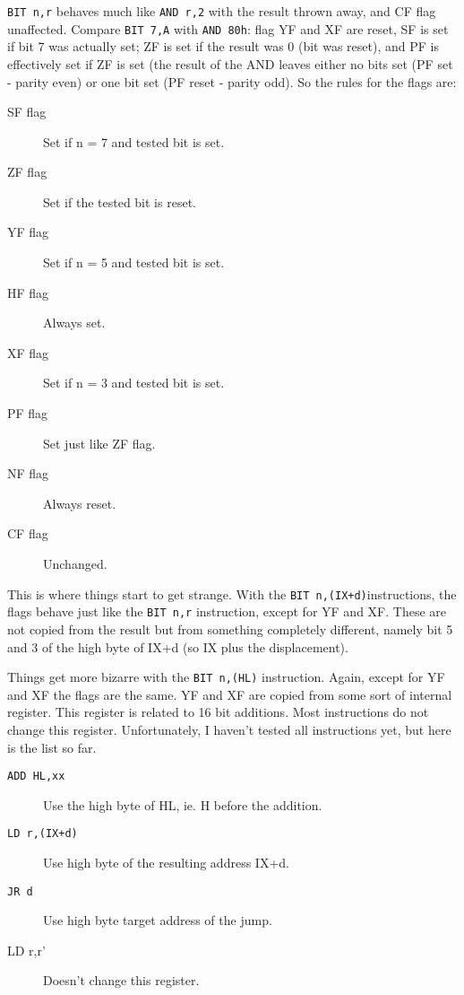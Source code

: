 \documentclass[oneside,a4paper]{book}
\begin{document}
{\tt BIT n,r} behaves much like {\tt AND r,2{\raisebox{1ex}{n}}} with the result thrown away, and CF flag unaffected. Compare {\tt BIT 7,A} with {\tt AND 80h}: flag YF and XF are reset, SF is set if bit 7 was actually set; ZF is set if the result was 0 (bit was reset), and PF is effectively set if ZF is set (the result of the AND leaves either no bits set (PF set - parity even) or one bit set (PF reset - parity odd). So the rules for the flags are:

\begin{description}

	\item[SF flag]
	Set if n = 7 and tested bit is set.

	\item[ZF flag]
	Set if the tested bit is reset.

	\item[YF flag]
	Set if n = 5 and tested bit is set.

	\item[HF flag]
	Always set.

	\item[XF flag]
	Set if n = 3 and tested bit is set.

	\item[PF flag]
	Set just like ZF flag.

	\item[NF flag]
	Always reset. 

	\item[CF flag]
	Unchanged.

\end{description}

This is where things start to get strange. With the {\tt BIT n,(IX+d)}instructions, the flags behave just like the {\tt BIT n,r} instruction, except for YF and XF. These are not copied from the result but from something completely different, namely bit 5 and 3 of the high byte of IX+d (so IX plus the displacement).

Things get more bizarre with the {\tt BIT n,(HL)} instruction. Again, except for YF and XF the flags are the same. YF and XF are copied from some sort of internal register. This register is related to 16 bit additions. Most instructions do not change this register. Unfortunately, I haven't tested all instructions yet, but here is the list so far.

\begin{description}

	\item[{\tt ADD HL,xx}]
	Use the high byte of HL, ie. H before the addition.

	\item[{\tt LD r,(IX+d)}]
	Use high byte of the resulting address IX+d.

	\item[{\tt JR d}]
	Use high byte target address of the jump.

	\item[{LD r,r'}]
	Doesn't change this register.

\end{description}
\end{document}

